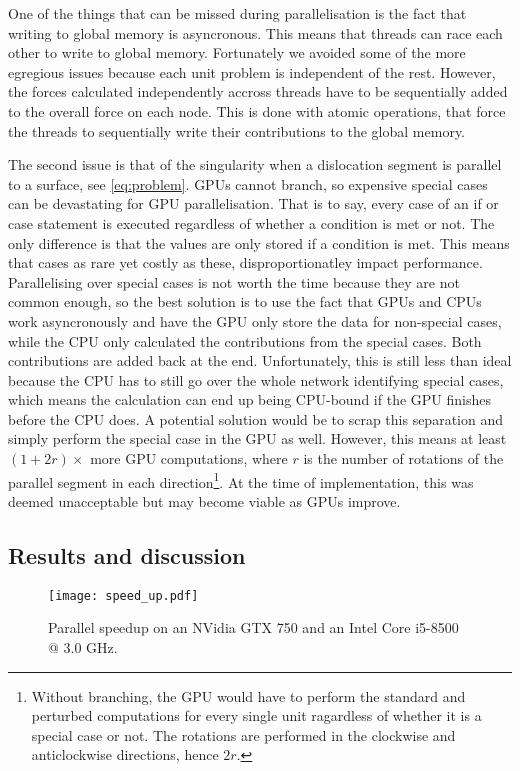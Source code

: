 One of the things that can be missed during parallelisation is the fact that writing to global memory is asyncronous. This means that threads can race each other to write to global memory. Fortunately we avoided some of the more egregious issues because each unit problem is independent of the rest. However, the forces calculated independently accross threads have to be sequentially added to the overall force on each node. This is done with atomic operations, that force the threads to sequentially write their contributions to the global memory.

The second issue is that of the singularity when a dislocation segment is parallel to a surface, see \cref{eq:problem}. GPUs cannot branch, so expensive special cases can be devastating for GPU parallelisation. That is to say, every case of an if or case statement is executed regardless of whether a condition is met or not. The only difference is that the values are only stored if a condition is met. This means that cases as rare yet costly as these, disproportionatley impact performance. Parallelising over special cases is not worth the time because they are not common enough, so the best solution is to use the fact that GPUs and CPUs work asyncronously and have the GPU only store the data for non-special cases, while the CPU only calculated the contributions from the special cases. Both contributions are added back at the end. Unfortunately, this is still less than ideal because the CPU has to still go over the whole network identifying special cases, which means the calculation can end up being CPU-bound if the GPU finishes before the CPU does. A potential solution would be to scrap this separation and simply perform the special case in the GPU as well. However, this means at least $(1 + 2r)\times$ more GPU computations, where $r$ is the number of rotations of the parallel segment in each direction\footnote{Without branching, the GPU would have to perform the standard and perturbed computations for every single unit ragardless of whether it is a special case or not. The rotations are performed in the clockwise and anticlockwise directions, hence $2r$.}. At the time of implementation, this was deemed unacceptable but may become viable as GPUs improve.

\subsection{Results and discussion}

\begin{figure}
    \centering
    \texttt{[image: speed\_up.pdf]}
    \caption[Parallel speedup on an NVidia GTX 750 and an Intel Core i5-8500 @ 3.0 GHz.]{Parallel speedup on an NVidia GTX 750 and an Intel Core i5-8500 @ 3.0 GHz.}
    \label{f:parallel}
\end{figure}

